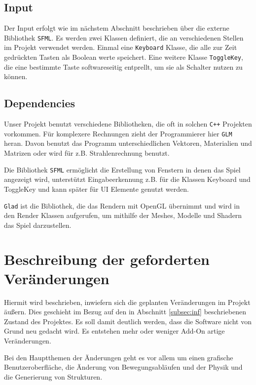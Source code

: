 \documentclass{article}
\begin{document}
\FloatBarrier
\subsection*{Input}

Der Input erfolgt wie im nächstem Abschnitt beschrieben über die externe Bibliothek \texttt{SFML}. Es werden zwei Klassen definiert, die an verschiedenen Stellen im Projekt verwendet werden. Einmal eine \texttt{Keyboard} Klasse, die alle zur Zeit gedrückten Tasten als Boolean werte speichert. Eine weitere Klasse \texttt{ToggleKey}, die eine bestimmte Taste softwareseitig entprellt, um sie als Schalter nutzen zu können.

\subsection*{Dependencies}

Unser Projekt benutzt verschiedene Bibliotheken, die oft in solchen \texttt{C++} Projekten vorkommen. Für komplexere Rechnungen zieht der Programmierer hier \texttt{GLM} heran. Davon benutzt das Programm unterschiedlichen Vektoren, Materialien und Matrizen oder wird für z.B. Strahlenrechnung benutzt.

Die Bibliothek \texttt{SFML} ermöglicht die Erstellung von Fenstern in denen das Spiel angezeigt wird, unterstützt Eingabeerkennung z.B. für die Klassen Keyboard und ToggleKey und kann später für UI Elemente genutzt werden.

\texttt{Glad} ist die Bibliothek, die das Rendern mit OpenGL übernimmt und wird in den Render Klassen aufgerufen, um mithilfe der Meshes, Modelle und Shadern das Spiel darzustellen.

\newpage
\section{Beschreibung der geforderten Veränderungen} \label{subsec:desc_of_changes}

Hiermit wird beschrieben, inwiefern sich die geplanten Veränderungen im Projekt äu\ss{}ern. Dies geschieht im Bezug auf den in Abschnitt \ref{subsec:inf} beschriebenen Zustand des Projektes. Es soll damit deutlich werden, dass die Software nicht von Grund neu gedacht wird. Es entstehen mehr oder weniger Add-On artige Veränderungen.

Bei den Hauptthemen der Änderungen geht es vor allem um einen grafische Benutzeroberfläche, die Änderung von Bewegungsabläufen und der Physik und die Generierung von Strukturen.
\end{document}
